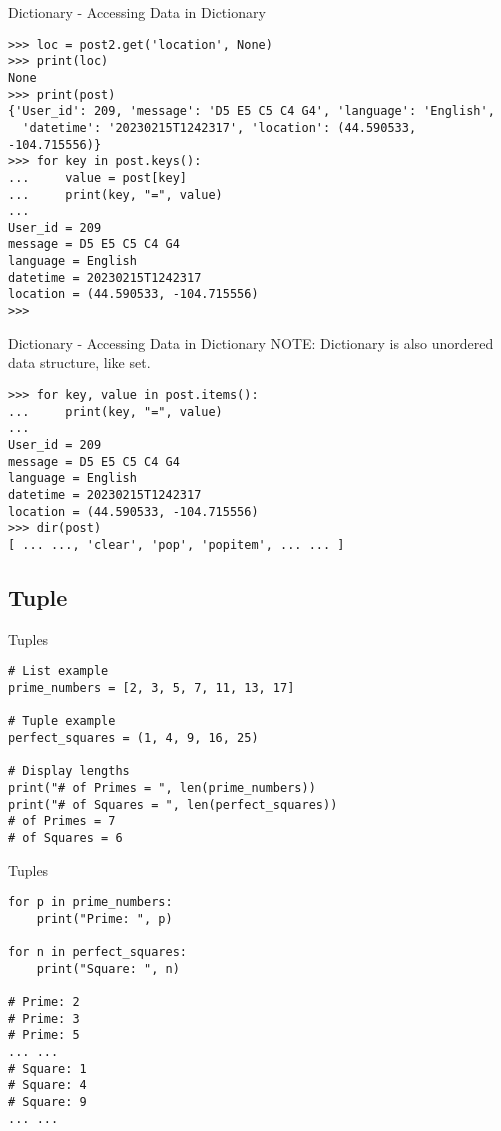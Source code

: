 \documentclass{beamer}
\begin{document}
\begin{frame}[fragile]{Dictionary - Accessing Data in Dictionary}
\begin{verbatim}
>>> loc = post2.get('location', None)
>>> print(loc)
None
>>> print(post)
{'User_id': 209, 'message': 'D5 E5 C5 C4 G4', 'language': 'English', 
  'datetime': '20230215T1242317', 'location': (44.590533, -104.715556)}
>>> for key in post.keys():
...     value = post[key]
...     print(key, "=", value)
...
User_id = 209
message = D5 E5 C5 C4 G4
language = English
datetime = 20230215T1242317
location = (44.590533, -104.715556)
>>>
\end{verbatim}
\end{frame}

\begin{frame}[fragile]{Dictionary - Accessing Data in Dictionary}
NOTE: Dictionary is also unordered data structure, like set.
\begin{verbatim}
>>> for key, value in post.items():
...     print(key, "=", value)
...
User_id = 209
message = D5 E5 C5 C4 G4
language = English
datetime = 20230215T1242317
location = (44.590533, -104.715556)
>>> dir(post)
[ ... ..., 'clear', 'pop', 'popitem', ... ... ]
\end{verbatim}
\end{frame}

\subsection{Tuple}

\begin{frame}[fragile]{Tuples}
\begin{verbatim}
# List example
prime_numbers = [2, 3, 5, 7, 11, 13, 17]

# Tuple example
perfect_squares = (1, 4, 9, 16, 25)

# Display lengths
print("# of Primes = ", len(prime_numbers))
print("# of Squares = ", len(perfect_squares))
# of Primes = 7
# of Squares = 6
\end{verbatim}
\end{frame}

\begin{frame}[fragile]{Tuples}
\begin{verbatim}
for p in prime_numbers:
    print("Prime: ", p)

for n in perfect_squares:
    print("Square: ", n)

# Prime: 2
# Prime: 3
# Prime: 5
... ...
# Square: 1
# Square: 4
# Square: 9
... ...
\end{verbatim}
\end{frame}
\end{document}
